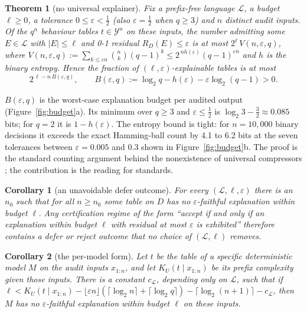 \documentclass[11pt,letterpaper]{article}
\newcommand{\Y}{\mathcal{Y}}
\newcommand{\Lang}{\mathcal{L}}
\newcommand{\D}{D}
\newcommand{\Ltwo}{\log_{2}}
\theoremstyle{plain}
\newtheorem{theorem}{Theorem}
\newtheorem{corollary}{Corollary}
\theoremstyle{definition}
\theoremstyle{remark}
\begin{document}
\begin{theorem}[no universal explainer]
\label{thm:counting}
Fix a prefix-free language $\Lang$, a budget $\ell\ge0$, a tolerance $0\le\varepsilon<\tfrac12$ (also $\varepsilon=\tfrac12$ when $q\ge3$) and $n$ distinct audit inputs. Of the $q^{n}$ behaviour tables $t\in\Y^{n}$ on these inputs, the number admitting some $E\in\Lang$ with $|E|\le\ell$ and 0-1 residual $R_{\D}(E)\le\varepsilon$ is at most $2^{\ell}\,V(n,\varepsilon,q)$, where $V(n,\varepsilon,q):=\sum_{k\le\varepsilon n}\binom nk(q-1)^{k}\le 2^{\,nh(\varepsilon)}(q-1)^{\varepsilon n}$ and $h$ is the binary entropy. Hence the fraction of $(\ell,\varepsilon)$-explainable tables is at most
\begin{equation}
2^{\,\ell-n\,B(\varepsilon,q)},\qquad B(\varepsilon,q):=\Ltwo q-h(\varepsilon)-\varepsilon\Ltwo(q-1)>0 .
\label{eq:budget}
\end{equation}
\end{theorem}

$B(\varepsilon,q)$ is the worst-case explanation budget per audited output (Figure~\ref{fig:budget}a). Its minimum over $q\ge3$ and $\varepsilon\le\frac12$ is $\Ltwo3-\frac32\approx0.085$ bits; for $q=2$ it is $1-h(\varepsilon)$. The entropy bound is tight: for $n=10{,}000$ binary decisions it exceeds the exact Hamming-ball count by 4.1 to 6.2 bits at the seven tolerances between $\varepsilon=0.005$ and $0.3$ shown in Figure~\ref{fig:budget}b. The proof is the standard counting argument behind the nonexistence of universal compressors \citep[\S2.2]{livitanyi2008}; the contribution is the reading for standards.

\begin{corollary}[an unavoidable defer outcome]
\label{cor:defer}
For every $(\Lang,\ell,\varepsilon)$ there is an $n_0$ such that for all $n\ge n_0$ some table on $\D$ has no $\varepsilon$-faithful explanation within budget $\ell$. Any certification regime of the form ``accept if and only if an explanation within budget $\ell$ with residual at most $\varepsilon$ is exhibited'' therefore contains a defer or reject outcome that no choice of $(\Lang,\ell)$ removes.
\end{corollary}

\begin{corollary}[the per-model form]
\label{cor:permodel}
Let $t$ be the table of a specific deterministic model $M$ on the audit inputs $x_{1:n}$, and let $K_U(t\mid x_{1:n})$ be its prefix complexity given those inputs. There is a constant $c_{\Lang}$, depending only on $\Lang$, such that if
$\ell<K_U(t\mid x_{1:n})-\lfloor\varepsilon n\rfloor(\lceil\Ltwo n\rceil+\lceil\Ltwo q\rceil)-\lceil\Ltwo(n+1)\rceil-c_{\Lang}$,
then $M$ has no $\varepsilon$-faithful explanation within budget $\ell$ on these inputs.
\end{corollary}
\end{document}
